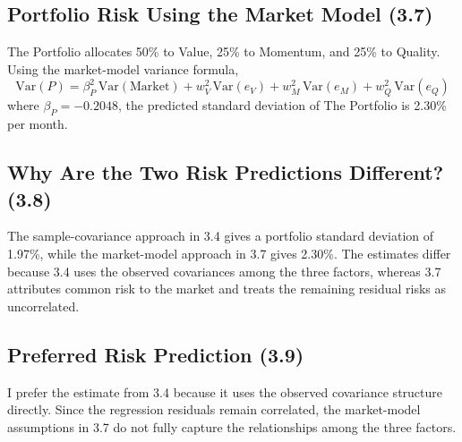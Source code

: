 \documentclass[11pt]{article}
\begin{document}
\subsection{Portfolio Risk Using the Market Model (3.7)}

The Portfolio allocates 50\% to Value, 25\% to Momentum, and 25\% to Quality. Using the market-model variance formula,
\[
\text{Var}(P) = \beta_P^2 \, \text{Var}(\text{Market}) + w_V^2 \, \text{Var}(e_V) + w_M^2 \, \text{Var}(e_M) + w_Q^2 \, \text{Var}(e_Q)
\]
where $\beta_P = -0.2048$, the predicted standard deviation of The Portfolio is 2.30\% per month.

\subsection{Why Are the Two Risk Predictions Different? (3.8)}

The sample-covariance approach in 3.4 gives a portfolio standard deviation of 1.97\%, while the market-model approach in 3.7 gives 2.30\%. The estimates differ because 3.4 uses the observed covariances among the three factors, whereas 3.7 attributes common risk to the market and treats the remaining residual risks as uncorrelated.

\subsection{Preferred Risk Prediction (3.9)}

I prefer the estimate from 3.4 because it uses the observed covariance structure directly. Since the regression residuals remain correlated, the market-model assumptions in 3.7 do not fully capture the relationships among the three factors.
\end{document}
